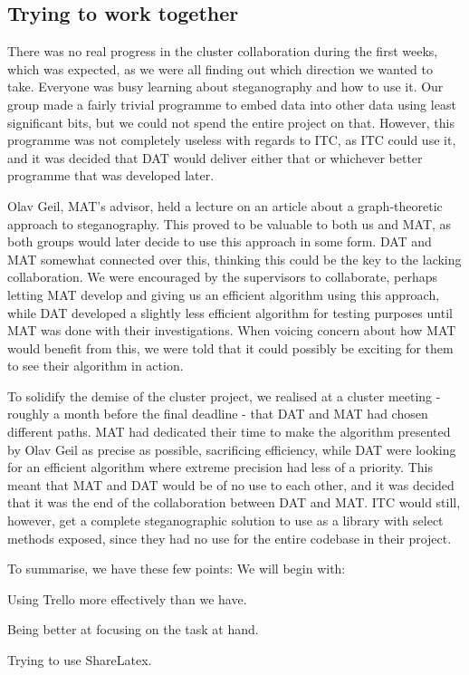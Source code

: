 \documentclass{article}
\begin{document}
\subsection*{Trying to work together}
There was no real progress in the cluster collaboration during the first weeks, which was expected, as we were all finding out which direction we wanted to take.
Everyone was busy learning about steganography and how to use it.
Our group made a fairly trivial programme to embed data into other data using least significant bits, but we could not spend the entire project on that. However, this programme was not completely useless with regards to ITC, as ITC could use it, and it was decided that DAT would deliver either that or whichever better programme that was developed later.

Olav Geil, MAT's advisor, held a lecture on an article about a graph-theoretic approach to steganography.
This proved to be valuable to both us and MAT, as both groups would later decide to use this approach in some form.
DAT and MAT somewhat connected over this, thinking this could be the key to the lacking collaboration.
We were encouraged by the supervisors to collaborate, perhaps letting MAT develop and giving us an efficient algorithm using this approach, while DAT developed a slightly less efficient algorithm for testing purposes until MAT was done with their investigations.
When voicing concern about how MAT would benefit from this, we were told that it could possibly be exciting for them to see their algorithm in action.

To solidify the demise of the cluster project, we realised at a cluster meeting - roughly a month before the final deadline - that DAT and MAT had chosen different paths.
MAT had dedicated their time to make the algorithm presented by Olav Geil as precise as possible, sacrificing efficiency, while DAT were looking for an efficient algorithm where extreme precision had less of a priority.
This meant that MAT and DAT would be of no use to each other, and it was decided that it was the end of the collaboration between DAT and MAT.
ITC would still, however, get a complete steganographic solution to use as a library with select methods exposed, since they had no use for the entire codebase in their project.

To summarise, we have these few points:
We will begin with:
\begin{list}
\item Using Trello more effectively than we have.
\item Being better at focusing on the task at hand.
\item Trying to use ShareLatex.
\end{list}
\end{document}

